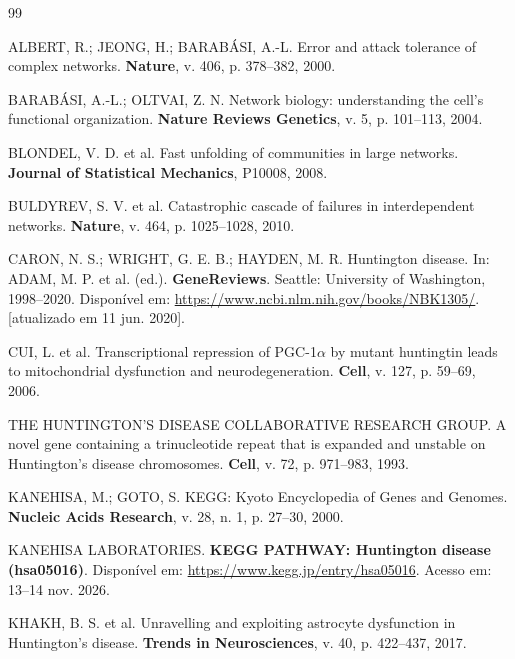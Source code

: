 \documentclass[12pt,a4paper]{article}
\begin{document}
\newpage
{}
\begin{thebibliography}{99}

ALBERT, R.; JEONG, H.; BARABÁSI, A.-L. Error and attack tolerance of complex networks. \textbf{Nature}, v. 406, p. 378--382, 2000.

BARABÁSI, A.-L.; OLTVAI, Z. N. Network biology: understanding the cell's functional organization. \textbf{Nature Reviews Genetics}, v. 5, p. 101--113, 2004.

BLONDEL, V. D. et al. Fast unfolding of communities in large networks. \textbf{Journal of Statistical Mechanics}, P10008, 2008.

BULDYREV, S. V. et al. Catastrophic cascade of failures in interdependent networks. \textbf{Nature}, v. 464, p. 1025--1028, 2010.

CARON, N. S.; WRIGHT, G. E. B.; HAYDEN, M. R. Huntington disease. In: ADAM, M. P. et al. (ed.). \textbf{GeneReviews}. Seattle: University of Washington, 1998--2020. Disponível em: \url{https://www.ncbi.nlm.nih.gov/books/NBK1305/}. [atualizado em 11 jun. 2020].

CUI, L. et al. Transcriptional repression of PGC-1$\alpha$ by mutant huntingtin leads to mitochondrial dysfunction and neurodegeneration. \textbf{Cell}, v. 127, p. 59--69, 2006.

THE HUNTINGTON'S DISEASE COLLABORATIVE RESEARCH GROUP. A novel gene containing a trinucleotide repeat that is expanded and unstable on Huntington's disease chromosomes. \textbf{Cell}, v. 72, p. 971--983, 1993.

KANEHISA, M.; GOTO, S. KEGG: Kyoto Encyclopedia of Genes and Genomes. \textbf{Nucleic Acids Research}, v. 28, n. 1, p. 27--30, 2000. 

KANEHISA LABORATORIES. \textbf{KEGG PATHWAY: Huntington disease (hsa05016)}. Disponível em: \url{https://www.kegg.jp/entry/hsa05016}. Acesso em: 13--14 nov. 2026.

KHAKH, B. S. et al. Unravelling and exploiting astrocyte dysfunction in Huntington's disease. \textbf{Trends in Neurosciences}, v. 40, p. 422--437, 2017.


\end{thebibliography}
\end{document}
